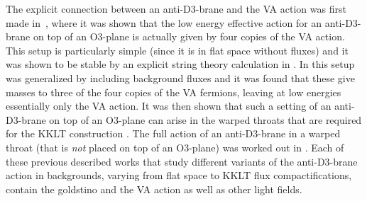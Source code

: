 \documentclass[11pt]{article}
\begin{document}
The explicit connection between an anti-D3-brane and the VA action was first made in~\cite{Kallosh:2014wsa}, where it was shown that the low energy effective action for an anti-D3-brane on top of an O3-plane is actually given by four copies of the VA action. This setup is particularly simple (since it is in flat space without fluxes) and it was shown to be stable by an explicit string theory calculation in \cite{Uranga:1999ib}. In \cite{Bergshoeff:2015jxa} this setup was generalized by including background fluxes and it was found that these give masses to three of the four copies of the VA fermions, leaving at low energies essentially only the VA action. It was then shown that such a setting of an anti-D3-brane on top of an O3-plane can arise in the warped throats that are required for the KKLT construction \cite{Kallosh:2015nia, Garcia-Etxebarria:2015lif}. The full action of an anti-D3-brane in a warped throat (that is \emph{not} placed on top of an O3-plane) was worked out in \cite{GarciadelMoral:2017vnz, Cribiori:2019hod}. Each of these previous described works that study different variants of the anti-D3-brane action in backgrounds, varying from flat space to KKLT flux compactifications, contain the goldstino and the VA action as well as other light fields. 
\end{document}

